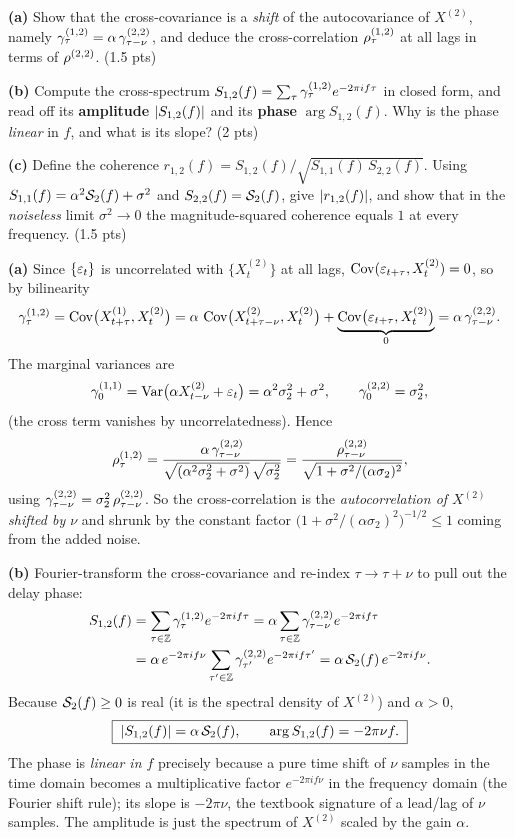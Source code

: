 \documentclass[11pt]{article}
\begin{document}
\textbf{(a)} Show that the cross-covariance is a \emph{shift} of the autocovariance of $X^{(2)}$, namely $\gamma_\tau^{(1,2)}=\alpha\,\gamma_{\tau-\nu}^{(2,2)}$, and deduce the cross-correlation $\rho_\tau^{(1,2)}$ at all lags in terms of $\rho^{(2,2)}$. \hfill(1.5 pts)

\textbf{(b)} Compute the cross-spectrum $S_{1,2}(f)=\sum_\tau\gamma_\tau^{(1,2)}e^{-2\pi if\tau}$ in closed form, and read off its \textbf{amplitude} $\left\lvert S_{1,2}(f) \right\rvert$ and its \textbf{phase} $\arg S_{1,2}(f)$. Why is the phase \emph{linear} in $f$, and what is its slope? \hfill(2 pts)

\textbf{(c)} Define the coherence $r_{1,2}(f)=S_{1,2}(f)/\sqrt{S_{1,1}(f)\,S_{2,2}(f)}$. Using $S_{1,1}(f)=\alpha^2\mathcal{S}_2(f)+\sigma^2$ and $S_{2,2}(f)=\mathcal{S}_2(f)$, give $\left\lvert r_{1,2}(f) \right\rvert$, and show that in the \emph{noiseless} limit $\sigma^2\to0$ the magnitude-squared coherence equals $1$ at every frequency. \hfill(1.5 pts)
\statementend

\textbf{(a)} Since $\{\varepsilon_t\}$ is uncorrelated with $\{X_t^{(2)}\}$ at all lags, $\operatorname{Cov}(\varepsilon_{t+\tau},X_t^{(2)})=0$, so by bilinearity
\[
\gamma_\tau^{(1,2)}=\operatorname{Cov}\bigl(X_{t+\tau}^{(1)},X_t^{(2)}\bigr)
=\alpha\,\operatorname{Cov}\bigl(X_{t+\tau-\nu}^{(2)},X_t^{(2)}\bigr)
+\underbrace{\operatorname{Cov}\bigl(\varepsilon_{t+\tau},X_t^{(2)}\bigr)}_{0}
=\alpha\,\gamma_{\tau-\nu}^{(2,2)} .
\]
The marginal variances are
\[
\gamma_0^{(1,1)}=\operatorname{Var}\bigl(\alpha X_{t-\nu}^{(2)}+\varepsilon_t\bigr)=\alpha^2\sigma_2^2+\sigma^2,
\qquad
\gamma_0^{(2,2)}=\sigma_2^2 ,
\]
(the cross term vanishes by uncorrelatedness). Hence
\[
\rho_\tau^{(1,2)}
=\frac{\alpha\,\gamma_{\tau-\nu}^{(2,2)}}{\sqrt{(\alpha^2\sigma_2^2+\sigma^2)}\,\sqrt{\sigma_2^2}}
=\frac{\rho_{\tau-\nu}^{(2,2)}}{\sqrt{1+\sigma^2/(\alpha\sigma_2)^2}} ,
\]
using $\gamma_{\tau-\nu}^{(2,2)}=\sigma_2^2\,\rho_{\tau-\nu}^{(2,2)}$. So the cross-correlation is the \emph{autocorrelation of $X^{(2)}$ shifted by $\nu$} and shrunk by the constant factor $\bigl(1+\sigma^2/(\alpha\sigma_2)^2\bigr)^{-1/2}\le1$ coming from the added noise.

\textbf{(b)} Fourier-transform the cross-covariance and re-index $\tau\to\tau+\nu$ to pull out the delay phase:
\[
\begin{aligned}
S_{1,2}(f)
&=\sum_{\tau\in\mathbb{Z}}\gamma_\tau^{(1,2)}e^{-2\pi if\tau}
=\alpha\sum_{\tau\in\mathbb{Z}}\gamma_{\tau-\nu}^{(2,2)}e^{-2\pi if\tau}\\
&=\alpha\,e^{-2\pi if\nu}\sum_{\tau'\in\mathbb{Z}}\gamma_{\tau'}^{(2,2)}e^{-2\pi if\tau'}
=\alpha\,\mathcal{S}_2(f)\,e^{-2\pi if\nu} .
\end{aligned}
\]
Because $\mathcal{S}_2(f)\ge0$ is real (it is the spectral density of $X^{(2)}$) and $\alpha>0$,
\[
\boxed{\;\left\lvert S_{1,2}(f) \right\rvert=\alpha\,\mathcal{S}_2(f),\qquad
\arg S_{1,2}(f)=-2\pi\nu f .\;}
\]
The phase is \emph{linear in $f$} precisely because a pure time shift of $\nu$ samples in the time domain becomes a multiplicative factor $e^{-2\pi if\nu}$ in the frequency domain (the Fourier shift rule); its slope is $-2\pi\nu$, the textbook signature of a lead/lag of $\nu$ samples. The amplitude is just the spectrum of $X^{(2)}$ scaled by the gain $\alpha$.
\end{document}
